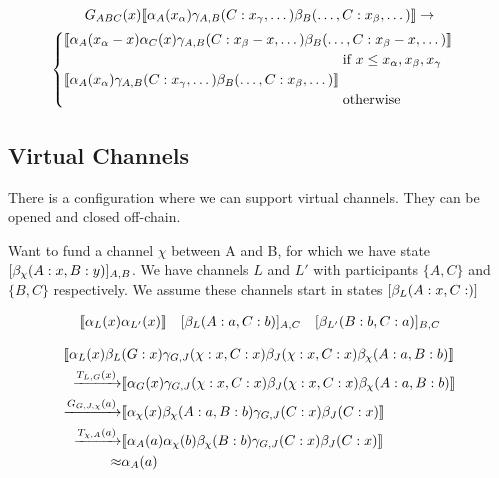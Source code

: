 \begin{multline*}
G_{ABC}(x) \adj{\alpha_A(x_\alpha)\gamma_{A,B}(C:x_\gamma, \dots)\beta_B(\dots, C:x_\beta, \dots)} \rightarrow \\
  \begin{cases}
      \adj{\alpha_A(x_\alpha - x)\alpha_C(x)\gamma_{A,B}(C:x_\beta -x, \dots)\beta_B(\dots, C:x_\beta - x, \dots)} \\
      \hspace{7cm} \text{if } x \leq x_\alpha, x_\beta, x_\gamma \\
      \adj{\alpha_A(x_\alpha)\gamma_{A,B}(C:x_\gamma, \dots)\beta_B(\dots, C:x_\beta, \dots)} \\
      \hspace{7cm} \text{otherwise}
  \end{cases}
\end{multline*}

\subsection{Virtual Channels}

There is a configuration where we can support virtual channels.
They can be opened and closed off-chain.

Want to fund a channel $\chi$ between A and B, for which we have state $[\beta_\chi(A: x, B:y)]_{A,B}$. We have channels $L$ and $L'$ with participants $\{A, C\}$ and $\{B, C\}$ respectively. We assume these channels start in states $[\beta_L(A:x, C:)]$

\begin{align*}
  \llbracket \alpha_L(x)\alpha_{L'}(x) \rrbracket \quad [\beta_L(A: a, C: b)]_{A,C} \quad [\beta_{L'}(B:b, C:a)]_{B, C}
\end{align*}

\begin{align*}
  & \llbracket \alpha_L(x)\beta_L(G: x)\gamma_{G,J}(\chi: x, C: x)\beta_J(\chi: x, C: x)\beta_\chi(A: a, B: b) \rrbracket\\ 
  & \begin{aligned}
   \xrightarrow{T_{L,G}(x)} & \llbracket \alpha_G(x)\gamma_{G, J}(\chi: x, C: x)\beta_J(\chi: x, C: x)\beta_\chi(A: a, B: b) \rrbracket \\
   \xrightarrow{G_{G, J, \chi}(a)} & \llbracket \alpha_\chi(x)\beta_\chi(A: a, B: b)\gamma_{G, J}(C: x)\beta_J(C: x) \rrbracket \\
   \xrightarrow{T_{\chi, A}(a)} & \llbracket \alpha_A(a)\alpha_\chi(b)\beta_\chi(B: b)\gamma_{G, J}(C: x)\beta_J(C: x) \rrbracket \\
   \approx & \alpha_A(a)
  \end{aligned}
\end{align*}




